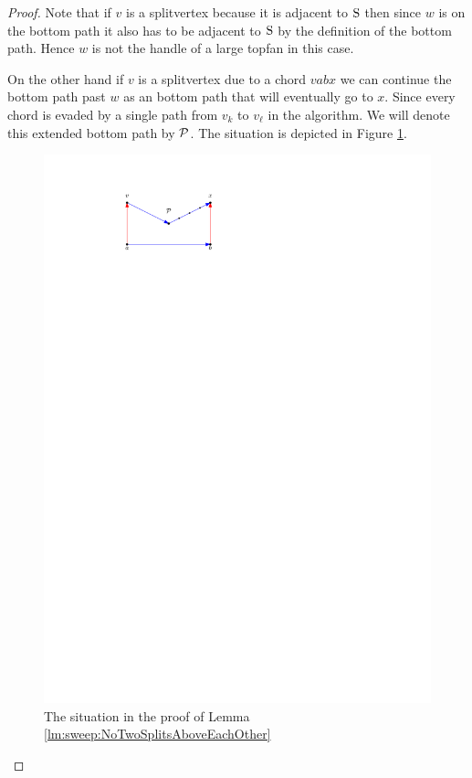   \begin{proof}
    Note that if $v$ is a splitvertex because it is adjacent to $\pS$ then since $w$ is on the bottom path it also has to be adjacent to $\pS$ by the definition of the bottom path.
    Hence $w$ is not the handle of a large topfan in this case.

    On the other hand if $v$ is a splitvertex due to a chord $v a b x$ we can continue the bottom path past $w$ as an bottom path that will eventually go to $x$.
    Since every chord is evaded by a single path from $v_k$ to $v_\ell$ in the algorithm.
    We will denote this extended bottom path by $\P$.
    The situation is depicted in Figure \ref{fig:sweep:botomPathChord}.

    \begin{figure}[h]
      \centering
      \includegraphics[scale=1]{unifiedAlgo/img/sweep/bottompathChord.pdf}
      \caption{The situation in the proof of Lemma \ref{lm:sweep:NoTwoSplitsAboveEachOther}}
      \label{fig:sweep:botomPathChord}
    \end{figure}


\end{proof}
